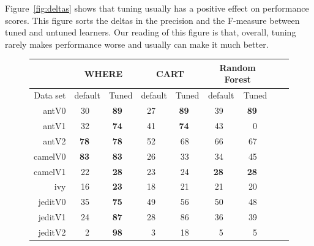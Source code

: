 \documentclass{sig-alternative}
\newcommand{\rone}{}
\newcommand{\rtwo}{}
\newcommand{\rthree}{}
\newcommand{\rfour}{}
\newcommand{\fig}[1]{Figure~\ref{fig:#1}}
\def\baselinestretch{1}
\begin{document}
\fig{deltas} shows that tuning usually has a positive effect on performance scores. This figure sorts
the deltas in the precision and the F-measure    between tuned and untuned learners. Our reading of this
figure is that, overall, tuning rarely makes performance   worse and usually can make it much better. 
 


\begin{figure}[!t]
\renewcommand{\baselinestretch}{0.8} 

\scriptsize    

\begin{tabular}{r|rl|rl|rl|rl|rl|rlrl}
      &   \multicolumn{4}{c|}{WHERE}         &   \multicolumn{4}{c|}{CART}         &   \multicolumn{4}{c}{Random Forest}         \\\hline
  Data set   &   \multicolumn{2}{c}{default}         &   \multicolumn{2}{c|}{Tuned}         &   \multicolumn{2}{c}{default}         &   \multicolumn{2}{c|}{Tuned}    &   \multicolumn{2}{c}{default}  &   \multicolumn{2}{c}{Tuned}\\\hline
antV0 & 30 &         & {\bf 89} & {\rfour} & 27 &         & {\bf 89} & {\rfour} & 39 &         & {\bf 89 }& {\rfour}\\
antV1 & 32 & {\rtwo} & {\bf 74} & {\rfour} & 41 & {\rtwo} & {\bf 74 }& {\rfour} & 43 & {\rtwo} & 0 &        \\
antV2 & {\bf 78} & {\rfour} & {\bf 78} & {\rfour} & 52 &         & 68 & {\rthree} & 66 & {\rtwo} & 67 & {\rtwo}\\
camelV0 & {\bf 83} & {\rfour} & {\bf 83} & {\rfour} & 26 &         & 33 &         & 34 &         & 45 & {\rone}\\
camelV1 & 22 &         & {\bf 28} & {\rfour} & 23 &         & 24 & {\rone} & {\bf 28} & {\rfour} & {\bf 28} & {\rfour}\\
ivy & 16 &         & {\bf 23} & {\rfour} & 18 & {\rone} & 21 & {\rthree} & 21 & {\rthree} & 20 & {\rtwo}\\
jeditV0 & 35 &         & {\bf 75} & {\rfour} & 49 & {\rone} & 56 & {\rtwo} & 50 & {\rone} & 48 & {\rone}\\
jeditV1 & 24 &         & {\bf 87} & {\rfour} & 28 &         & 86 & {\rfour} & 36 &         & 39 & {\rone}\\
jeditV2 & 2 &         & {\bf 98 }& {\rfour} & 3 &         & 18 &         & 5 &         & 5 &        \\

\end{tabular}
\end{figure}
\end{document}
